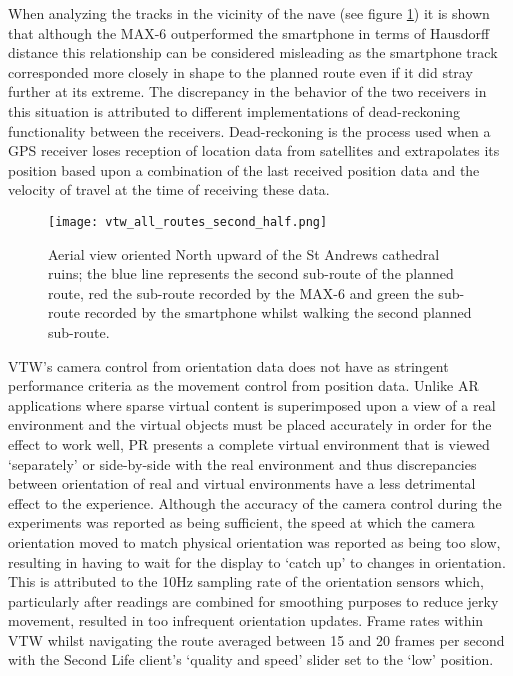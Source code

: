 When analyzing the tracks in the vicinity of the nave (see figure \ref{vtw_all_routes_second_half.png}) it is shown that although the MAX-6 outperformed the smartphone in terms of Hausdorff distance this relationship can be considered misleading as the smartphone track corresponded more closely in shape to the planned route even if it did stray further at its extreme. The discrepancy in the behavior of the two receivers in this situation is attributed to different implementations of dead-reckoning functionality between the receivers. Dead-reckoning is the process used when a GPS receiver loses reception of location data from satellites and extrapolates its position based upon a combination of the last received position data and the velocity of travel at the time of receiving these data.
 
\begin{figure}[h]
\centering
\texttt{[image: vtw\_all\_routes\_second\_half.png]}
\caption{Aerial view oriented North upward of the St Andrews cathedral ruins; the blue line represents the second sub-route of the planned route, red the sub-route recorded by the MAX-6 and green the sub-route recorded by the smartphone whilst walking the second planned sub-route.}
\label{vtw_all_routes_second_half.png}
\end{figure}

VTW's camera control from orientation data does not have as stringent performance criteria as the movement control from position data. Unlike AR applications where sparse virtual content is superimposed upon a view of a real environment and the virtual objects must be placed accurately in order for the effect to work well, PR presents a complete virtual environment that is viewed `separately' or side-by-side with the real environment and thus discrepancies between orientation of real and virtual environments have a less detrimental effect to the experience. Although the accuracy of the camera control during the experiments was reported as being sufficient, the speed at which the camera orientation moved to match physical orientation was reported as being too slow, resulting in having to wait for the display to `catch up' to changes in orientation. This is attributed to the 10Hz sampling rate of the orientation sensors which, particularly after readings are combined for smoothing purposes to reduce jerky movement, resulted in too infrequent orientation updates. Frame rates within VTW whilst navigating the route averaged between 15 and 20 frames per second with the Second Life client's `quality and speed' slider set to the `low' position.

